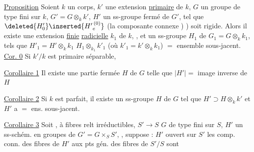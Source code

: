 \uline{Proposition} Soient $k$ un corps, $k'$ une extension
\margin{\rule[-4\baselineskip]{0.35pt}{4\baselineskip}}\uline{primaire} de $k$, $G$ un groupe  de type fini sur
$k$, $G'=G\otimes_k k'$, $H'$ un ss-groupe fermé de
$G'$, tel que $\deleted{H'_{0}}\inserted{{H'}^{\,(0)}_e}$ (la composante connexe ) )
soit rigide. Alors il existe une 
extension \uline{finie} \uline{radicielle} $k_1$ de $k$, ,
 et un ss-groupe  $H_1$ de $G_1=G\otimes_k k_1$,
tels que $H'_1=H'\otimes_k k_1$    $H_1\otimes_{k_1}k'_1$
(où $k'_1=k'\otimes_k k_1$)   $=$ ensemble sous-jacent.
\uline{Cor. 0} Si $k'/k$ est  primaire séparable, 


\uline{Corollaire 1} Il existe une 
partie fermée $H$ de $G$ telle que
$|H'|={}$ image inverse de $H$

\uline{Corollaire 2} Si $k$ est parfait, il existe un
ss-groupe $H$ de $G$ tel que $H'\supset H\otimes_k k'$ et
$H'$ a $=$ ens. sous-jacent.

\uline{Corollaire 3} Soit ,
à fibres relt  irréductibles, $S'\longrightarrow S$
$G$   de type fini sur $S$,
$H'$ un ss-schém. en groupes de $G'=G\times_S S'$, , 
suppose :  $H'$ ouvert sur $S'$  les comp.
conn. des fibres de $H'$ aux pts gén. des fibres de $S'/S$ sont
